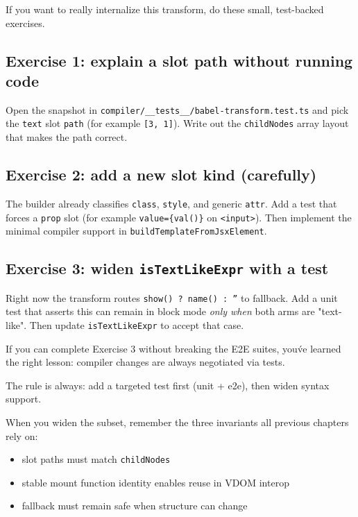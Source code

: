 If you want to really internalize this transform, do these small, test-backed exercises.

\subsection{Exercise 1: explain a slot path without running code}

Open the snapshot in \texttt{compiler/\_\_tests\_\_/babel-transform.test.ts} and pick the \texttt{text} slot \texttt{path} (for example \texttt{[3, 1]}).
Write out the \texttt{childNodes} array layout that makes the path correct.

\subsection{Exercise 2: add a new slot kind (carefully)}

The builder already classifies \texttt{class}, \texttt{style}, and generic \texttt{attr}.
Add a test that forces a \texttt{prop} slot (for example \texttt{value=\{val()\}} on \texttt{<input>}).
Then implement the minimal compiler support in \texttt{buildTemplateFromJsxElement}.

\subsection{Exercise 3: widen \texttt{isTextLikeExpr} with a test}

Right now the transform routes \texttt{show() ? name() : ''} to fallback.
Add a unit test that asserts this can remain in block mode \emph{only when} both arms are "text-like".
Then update \texttt{isTextLikeExpr} to accept that case.

If you can complete Exercise 3 without breaking the E2E suites, you\'ve learned the right lesson: compiler changes are always negotiated via tests.

The rule is always: add a targeted test first (unit + e2e), then widen syntax support.

When you widen the subset, remember the three invariants all previous chapters rely on:

\begin{itemize}
\item slot paths must match \texttt{childNodes}
\item stable mount function identity enables reuse in VDOM interop
\item fallback must remain safe when structure can change
\end{itemize}

